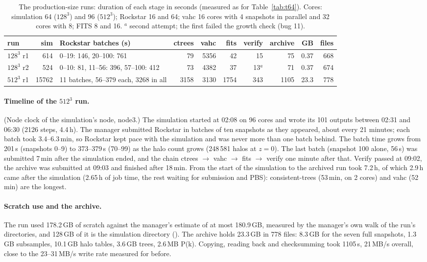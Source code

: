 \documentclass[10pt,a4paper]{article}
\newcommand{\code}[1]{\texttt{\detokenize{#1}}}
\begin{document}
\begin{table}[t]
\centering\small
\begin{tabular}{@{}l r l r r r r r r r@{}}
\toprule
run & sim & Rockstar batches (s) & ctrees & vahc & fits & verify & archive & GB & files \\
\midrule
$128^3$ r1 & 614 & 0--19: 146, 20--100: 761 & 79 & 5356 & 42 & 15 & 75 & 0.37 & 668 \\
$128^3$ r2 & 524 & 0--10: 81, 11--56: 396, 57--100: 412 & 73 & 4382 & 37 & 13$^a$ & 71 & 0.37 & 674 \\
$512^3$ r1 & 15762 & 11 batches, 56--379 each, 3268 in all & 3158 & 3130 & 1754 & 343 & 1105 & 23.3 & 778 \\
\bottomrule
\end{tabular}
\caption{The production-size runs: duration of each stage in seconds (measured as for Table~\ref{tab:t64}).
Cores: simulation 64 ($128^3$) and 96 ($512^3$); Rockstar 16 and 64; vahc 16 cores with 4 snapshots in parallel
and 32 cores with 8; FITS 8 and 16. $^a$ second attempt; the first failed the growth check (bug 11).}
\label{tab:tprod}
\end{table}

\paragraph{Timeline of the $512^3$ run.} (Node clock of the simulation's node, node3.) The simulation started at
02:08 on 96 cores and wrote its 101 outputs between 02:31 and 06:30 (2126 steps, 4.4\,h). The manager submitted
Rockstar in batches of ten snapshots as they appeared, about every 21 minutes; each batch took 3.4--6.3\,min, so
Rockstar kept pace with the simulation and was never more than one batch behind. The batch time grows from 201\,s
(snapshots 0--9) to 373--379\,s (70--99) as the halo count grows (248\,581 halos at $z=0$). The last batch
(snapshot 100 alone, 56\,s) was submitted 7\,min after the simulation ended, and the chain ctrees $\to$ vahc
$\to$ fits $\to$ verify one minute after that. Verify passed at 09:02, the archive was submitted at 09:03 and
finished after 18\,min. From the start of the simulation to the archived run took 7.2\,h, of which 2.9\,h
came after the simulation (2.65\,h of job time, the rest waiting for submission and PBS): consistent-trees (53\,min, on 2 cores) and vahc (52\,min) are the longest.

\paragraph{Scratch use and the archive.} The run used 178.2\,GB of scratch against the manager's estimate of at
most 180.9\,GB, measured by the manager's own walk of the run's directories, and 128\,GB of it is the simulation
directory (\code{du}). The archive holds 23.3\,GB in 778 files: 8.3\,GB for the seven full snapshots, 1.3\,GB
subsamples, 10.1\,GB halo tables, 3.6\,GB trees, 2.6\,MB P(k). Copying, reading back and checksumming took 1105\,s,
21\,MB/s overall, close to the 23--31\,MB/s write rate measured for \code{/storage} before.
\end{document}
